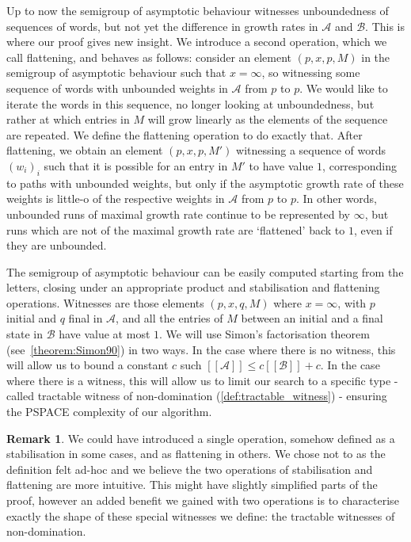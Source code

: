 \documentclass[10pt,a4paper]{amsart}
\theoremstyle{definition}
\newtheorem{rem}[rem]{Remark}
\numberwithin{equation}{section}
\theoremstyle{remark}
\newcommand{\autA}{\mathcal{A}}
\newcommand{\autB}{\mathcal{B}}
\newcommand{\brfunc}[1]{[\![#1]\!]}
\newcommand{\funcA}{\brfunc{\autA}}
\newcommand{\funcB}{\brfunc{\autB}}
\theoremstyle{remark}
\begin{document}
Up to now the semigroup of asymptotic behaviour witnesses unboundedness of sequences of words, but not yet the difference in growth rates in $\autA$ and $\autB$. This is where our proof gives new insight. We introduce a second operation, which we call flattening, and behaves as follows: consider an element $(p,x,p,M)$ in the semigroup of asymptotic behaviour such that $x=\infty$, so witnessing some sequence of words with unbounded weights in $\autA$ from $p$ to $p$. We would like to iterate the words in this sequence, no longer looking at unboundedness, but rather at which entries in $M$ will grow linearly as the elements of the sequence are repeated. We define the flattening operation to do exactly that. After flattening, we obtain an element $(p,x,p,M')$ witnessing a sequence of words $(w_i)_i$ such that it is possible for an entry in $M'$ to have value $1$, corresponding to paths with unbounded weights, but only if the asymptotic growth rate of these weights is little-o of the respective weights in $\autA$ from $p$ to $p$. In other words, unbounded runs of maximal growth rate continue to be represented by $\infty$, but runs which are not of the maximal growth rate are `flattened' back to $1$, even if they are unbounded. 

The semigroup of asymptotic behaviour can be easily computed starting from the letters, closing under an appropriate product and stabilisation and flattening operations. Witnesses are those elements $(p,x,q,M)$ where $x = \infty$, with $p$ initial and $q$ final in $\autA$, and all the entries of $M$ between an initial and a final state in $\autB$ have value at most $1$. We will use Simon's factorisation theorem~\cite{Simon90} (see~\cref{theorem:Simon90}) in two ways. In the case where there is no witness, this will allow us to bound a constant $c$ such $\funcA \le c\funcB + c$. In the case where there is a witness, this will allow us to limit our search to a specific type - called tractable witness of non-domination (\cref{def:tractable_witness}) - ensuring the PSPACE complexity of our algorithm.

\begin{rem}
We could have introduced a single operation, somehow defined as a stabilisation in some cases, and as flattening in others. We chose not to as the definition felt ad-hoc and we believe the two operations of stabilisation and flattening are more intuitive. This might have slightly simplified parts of the proof, however an added benefit we gained with two operations is to characterise exactly the shape of these special witnesses we define: the tractable witnesses of non-domination.
\end{rem}
\pagebreak[5]
\end{document}
